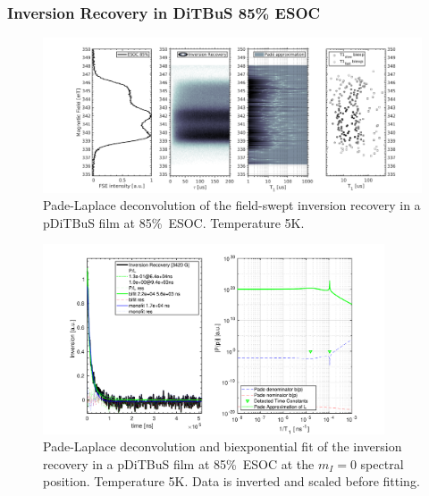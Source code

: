 \subsubsection{Inversion Recovery in DiTBuS 85\% ESOC}
\begin{figure}[h]
\center
	\includegraphics[width=1\textwidth]{./pulse/figures/Figure_S18.pdf}
	\caption{Pade-Laplace deconvolution of the field-swept inversion recovery in a pDiTBuS film at 85\%~ESOC. Temperature 5K.}
	\label{fig:Figure_S18}
\end{figure}


\begin{figure}[ht!]
\center
	\includegraphics[width=0.9\textwidth]{./pulse/figures/Figure_S19.pdf}
	\caption{Pade-Laplace deconvolution and biexponential fit of the inversion recovery in a pDiTBuS film at 85\%~ESOC at the $m_I=0$ spectral position. Temperature 5K. Data is inverted and scaled before fitting.}
	\label{fig:Figure_S19}
\end{figure}




\subsection{}
\label{esi:dead_time}

